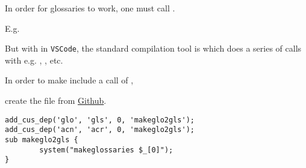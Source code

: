 
In order for glossaries to work, one must call .

E.g.  \ra\  \ra\ 

But with  in \texttt{VSCode}, the standard compilation tool is  which does a series of calls with e.g. , , etc.

In order to make  include a call of ,

create the file  from \href{https://github.com/robinhellmers/computer_setup}{Github}.

\begin{verbatim}
add_cus_dep('glo', 'gls', 0, 'makeglo2gls');
add_cus_dep('acn', 'acr', 0, 'makeglo2gls');
sub makeglo2gls {
        system("makeglossaries $_[0]");
}
\end{verbatim}